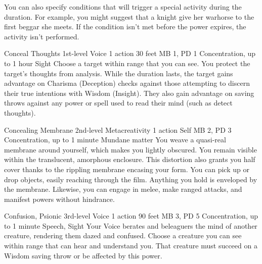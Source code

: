 You can also specify conditions that will trigger a special
activity during the duration. For example, you might suggest
that a knight give her warhorse to the first beggar she meets.
If the condition isn't met before the power expires, the
activity isn't performed.

\DndPowerHeader%
    {Conceal Thoughts\label{pwr:conceal_thoughts}}
    {1st-level Voice}
    {1 action}
    {30 feet}
    {MB 1, PD 1}
    {Concentration, up to 1 hour}
    {Sight}
Choose a target within range that you can
see. You protect the target's thoughts from analysis. While
the duration lasts, the target gains advantage on 
Charisma (Deception) checks against those
attempting to discern their true intentions
with Wisdom (Insight). They also gain advantage on saving
throws against any power or spell used to read their mind
(such as detect thoughts).

\DndPowerHeader%
    {Concealing Membrane\label{pwr:concealing_membrane}}
    {2nd-level Metacreativity}
    {1 action}
    {Self}
    {MB 2, PD 3}
    {Concentration, up to 1 minute}
    {Mundane matter}
You weave a quasi-real membrane around yourself,
which makes you lightly obscured. You remain visible within
the translucent, amorphous enclosure. This distortion also
grants you half cover thanks to the rippling membrane encasing
your form. You can pick up or drop objects, easily reaching
through the film. Anything you hold is enveloped by the membrane.
Likewise, you can engage in melee, make ranged attacks, and
manifest powers without hindrance.

\DndPowerHeader%
    {Confusion, Psionic\label{pwr:confusion_psionic}}
    {3rd-level Voice}
    {1 action}
    {90 feet}
    {MB 3, PD 5}
    {Concentration, up to 1 minute}
    {Speech, Sight}
Your Voice berates and beleaguers the mind of another creature,
rendering them dazed and confused.
Choose a creature you can see within range that can
hear and understand you.
That creature must succeed on a Wisdom saving throw or
be affected by this power.

